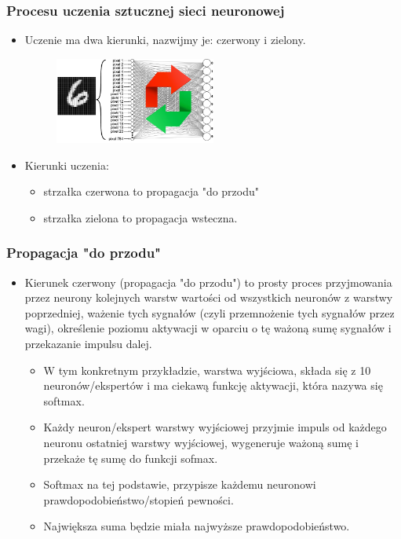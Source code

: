 \documentclass{beamer}
\begin{document}
\begin{frame}[fragile]
\frametitle{Procesu uczenia sztucznej sieci neuronowej}
\begin{itemize}
\item Uczenie ma dwa kierunki, nazwijmy je: czerwony i zielony.

                    \begin{figure}[h]
                        \centering
                        \includegraphics[width=0.5\textwidth]{../../img/mnist_1layer with arrows.png}
                    \end{figure}                    
                    \item Kierunki uczenia: 
	\begin{itemize}
	\item strzałka czerwona to propagacja "do przodu"
	\item strzałka zielona to propagacja wsteczna.
	\end{itemize}
\end{itemize}
\end{frame}

\begin{frame}[fragile]
\frametitle{Propagacja "do przodu"}
\begin{itemize}
\item Kierunek czerwony (propagacja "do przodu") to prosty proces przyjmowania przez neurony kolejnych warstw wartości od wszystkich neuronów z warstwy poprzedniej, ważenie tych sygnałów (czyli przemnożenie tych sygnałów przez wagi), określenie poziomu aktywacji w oparciu o tę ważoną sumę sygnałów i przekazanie impulsu dalej.
	\begin{itemize}
	\item W tym konkretnym przykładzie, warstwa wyjściowa, składa się z 10 neuronów/ekspertów i ma ciekawą funkcję aktywacji, która nazywa się softmax.
	\item Każdy neuron/ekspert warstwy wyjściowej przyjmie impuls od każdego neuronu ostatniej warstwy wyjściowej, wygeneruje ważoną sumę i przekaże tę sumę do funkcji sofmax.
	\item Softmax na tej podstawie, przypisze każdemu neuronowi prawdopodobieństwo/stopień pewności.
	\item Największa suma będzie miała najwyższe prawdopodobieństwo.
	\end{itemize}
\end{itemize}
\end{frame}
\end{document}
